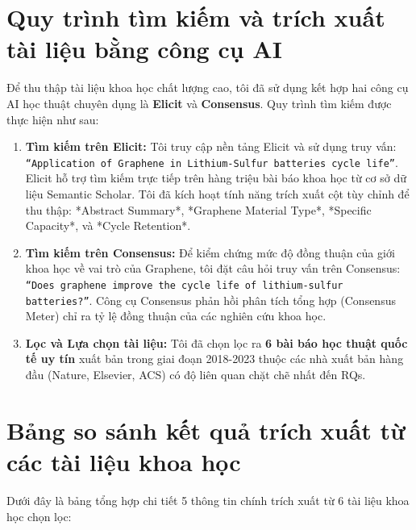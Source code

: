 \documentclass[12pt,a4paper]{article}
\begin{document}
\section{Quy trình tìm kiếm và trích xuất tài liệu bằng công cụ AI}

Để thu thập tài liệu khoa học chất lượng cao, tôi đã sử dụng kết hợp hai công cụ AI học thuật chuyên dụng là \textbf{Elicit} và \textbf{Consensus}. Quy trình tìm kiếm được thực hiện như sau:

\begin{enumerate}
    \item \textbf{Tìm kiếm trên Elicit:} Tôi truy cập nền tảng Elicit và sử dụng truy vấn: \texttt{``Application of Graphene in Lithium-Sulfur batteries cycle life''}. Elicit hỗ trợ tìm kiếm trực tiếp trên hàng triệu bài báo khoa học từ cơ sở dữ liệu Semantic Scholar. Tôi đã kích hoạt tính năng trích xuất cột tùy chỉnh để thu thập: *Abstract Summary*, *Graphene Material Type*, *Specific Capacity*, và *Cycle Retention*.
    \item \textbf{Tìm kiếm trên Consensus:} Để kiểm chứng mức độ đồng thuận của giới khoa học về vai trò của Graphene, tôi đặt câu hỏi truy vấn trên Consensus: \texttt{``Does graphene improve the cycle life of lithium-sulfur batteries?''}. Công cụ Consensus phản hồi phân tích tổng hợp (Consensus Meter) chỉ ra tỷ lệ đồng thuận của các nghiên cứu khoa học.
    \item \textbf{Lọc và Lựa chọn tài liệu:} Tôi đã chọn lọc ra \textbf{6 bài báo học thuật quốc tế uy tín} xuất bản trong giai đoạn 2018-2023 thuộc các nhà xuất bản hàng đầu (Nature, Elsevier, ACS) có độ liên quan chặt chẽ nhất đến RQs.
\end{enumerate}

\newpage
\section{Bảng so sánh kết quả trích xuất từ các tài liệu khoa học}

Dưới đây là bảng tổng hợp chi tiết 5 thông tin chính trích xuất từ 6 tài liệu khoa học chọn lọc:
\end{document}
